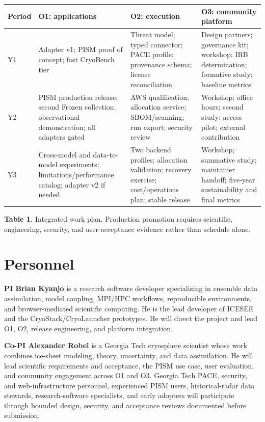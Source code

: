 \begin{center}
\scriptsize
\begin{tabular}{@{}p{}p{}p{}p{}@{}}
\toprule
Period & O1: applications & O2: execution & O3: community platform \\
\midrule
Y1 & Adapter v1; PISM proof of concept; fast CryoBench tier & Threat model;
typed connector; PACE profile; provenance schema; license reconciliation &
Design partners; governance kit; workshop; IRB determination; formative study; baseline metrics \\
Y2 & PISM production release; second Frozen collection; observational demonstration; all adapters gated
& AWS qualification; allocation service; SBOM/scanning; run export; security review &
Workshop; office hours; second study; access pilot; external contribution \\
Y3 & Cross-model and data-to-model experiments; limitations/performance catalog; adapter v2 if
needed & Two backend profiles; allocation validation; recovery exercise; cost/operations plan;
stable release & Workshop; summative study; maintainer handoff; five-year
sustainability and final metrics \\
\bottomrule
\end{tabular}

\vspace{3pt}
\parbox{0.92\textwidth}{\footnotesize\textbf{Table 1.} Integrated work plan.
Production promotion requires scientific, engineering, security, and
user-acceptance evidence rather than schedule alone.}
\end{center}

\section{Personnel}

\textbf{PI Brian Kyanjo} is a research software developer specializing in
ensemble data assimilation, model coupling, MPI/HPC workflows, reproducible
environments, and browser-mediated scientific computing. He is the lead
developer of ICESEE and the CryoStack/CryoLauncher prototypes. He will direct
the project and lead O1, O2, release engineering, and platform integration.

\textbf{Co-PI Alexander Robel} is a Georgia Tech cryosphere scientist whose
work combines ice-sheet modeling, theory, uncertainty, and data assimilation.
He will lead scientific requirements and acceptance, the PISM use case, user
evaluation, and community engagement across O1 and O3. Georgia Tech PACE,
security, and web-infrastructure personnel, experienced PISM users,
historical-radar data stewards, research-software specialists, and early adopters will participate
through bounded design, security, and acceptance reviews documented before
submission.

